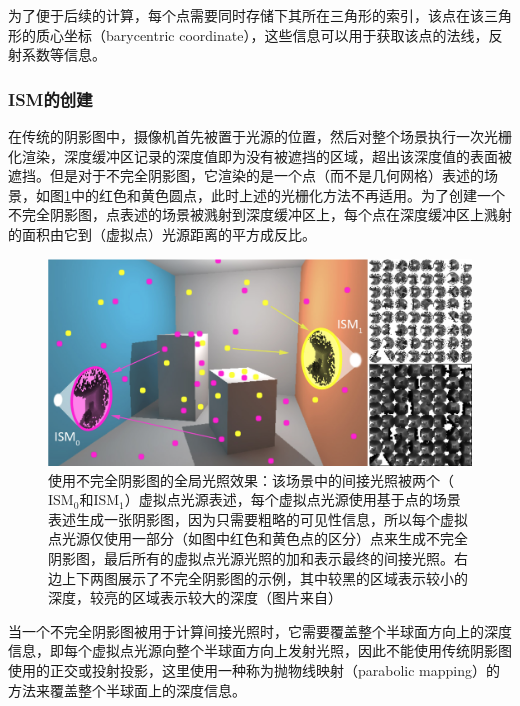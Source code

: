 为了便于后续的计算，每个点需要同时存储下其所在三角形的索引，该点在该三角形的质心坐标（barycentric coordinate），这些信息可以用于获取该点的法线，反射系数等信息。




\subsubsection{ISM的创建}
在传统的阴影图中，摄像机首先被置于光源的位置，然后对整个场景执行一次光栅化渲染，深度缓冲区记录的深度值即为没有被遮挡的区域，超出该深度值的表面被遮挡。但是对于不完全阴影图，它渲染的是一个点（而不是几何网格）表述的场景，如图\ref{f:ir-imperfect-shadow-maps}中的红色和黄色圆点，此时上述的光栅化方法不再适用。为了创建一个不完全阴影图，点表述的场景被溅射到深度缓冲区上，每个点在深度缓冲区上溅射的面积由它到（虚拟点）光源距离的平方成反比。

\begin{figure}
	\includegraphics[width=\textwidth]{figures/ir/ir-4-2}
	\caption{使用不完全阴影图的全局光照效果：该场景中的间接光照被两个（$\text{ISM}_0$和$\text{ISM}_1$）虚拟点光源表述，每个虚拟点光源使用基于点的场景表述生成一张阴影图，因为只需要粗略的可见性信息，所以每个虚拟点光源仅使用一部分（如图中红色和黄色点的区分）点来生成不完全阴影图，最后所有的虚拟点光源光照的加和表示最终的间接光照。右边上下两图展示了不完全阴影图的示例，其中较黑的区域表示较小的深度，较亮的区域表示较大的深度（图片来自\cite{a:ImperfectShadowMapsforEfficientComputationofIndirectIllumination}）}
	\label{f:ir-imperfect-shadow-maps}
\end{figure}

当一个不完全阴影图被用于计算间接光照时，它需要覆盖整个半球面方向上的深度信息，即每个虚拟点光源向整个半球面方向上发射光照，因此不能使用传统阴影图使用的正交或投射投影，这里使用一种称为抛物线映射（parabolic mapping）\cite{a:ShadowMappingforHemisphericalandOmnidirectionalLightSources}的方法来覆盖整个半球面上的深度信息。

